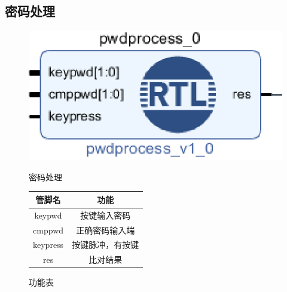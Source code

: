 \documentclass[a4paper,11pt]{ctexart}
\begin{document}
\subsection{密码处理}
\begin{figure}[htb]
  \begin{minipage}[b]{0.5\textwidth}
    \centering
    \includegraphics{./images/pwdprocess.eps}
    \caption{密码处理}
    \label{fig:by:table}
  \end{minipage}%
  \begin{minipage}[b]{0.5\textwidth}
    \centering
    \begin{tabular}{|c|c|} \hline
      管脚名 & 功能 \\ \hline\hline
      keypwd    &   按键输入密码 \\
      cmppwd    & 正确密码输入端 \\
      keypress  & 按键脉冲，有按键 \\
      res       &  比对结果 \\ \hline
    \end{tabular}
    \caption{功能表}
    \label{table:by:fig}
  \end{minipage}
\end{figure}
\end{document}
